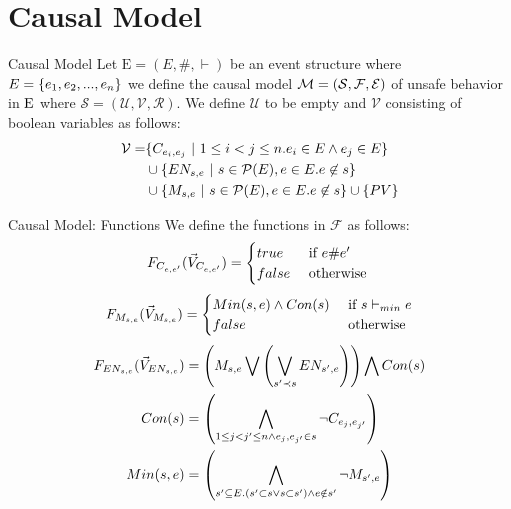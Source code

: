 \section{Causal Model}

\begin{frame}{Causal Model}
    Let $\mathrm{E} = (E,\#,\vdash)$ be an event structure where
    $E = \{e_1, e_2, ...,e_n\}$ we define the causal model
    $\mathcal{M} = (\mathcal{S},\mathcal{F},\mathcal{E})$ of unsafe behavior
    in $\mathrm{E}$ where
    $\mathcal{S} = (\mathcal{U},\mathcal{V},\mathcal{R})$.
    We define $\mathcal{U}$ to be empty and $\mathcal{V}$
    consisting of boolean variables as follows:
    \begin{align*}
        \mathcal{V} = & \{C_{e_i,e_j} ~|~  1 \leq i < j \leq n.
        e_i \in E \wedge e_j \in E\}                                \\
                      & \cup \{EN_{s,e} ~|~ s \in \mathcal{P}(E),
        e \in E. e \not \in s \}                                    \\
                      & \cup \{M_{s,e} ~|~ s \in \mathcal{P}(E),
            e \in E. e \not \in s \} \cup \{PV\}
    \end{align*}
\end{frame}

\begin{frame}{Causal Model: Functions}
    We define the functions in $\mathcal{F}$ as follows:
    $$
        F_{C_{e,e'}}(\vec V_{C_{e,e'}}) = \begin{cases}
            true  & \text{ if } e \# e' \\
            false & \text{ otherwise }
        \end{cases}
    $$
    $$
        F_{M_{s,e}}(\vec V_{M_{s,e}}) = \begin{cases}
            Min(s,e) \wedge Con(s) & \text{ if } s \vdash_{min} e \\
            false                  & \text{ otherwise }
        \end{cases}
    $$
    \begin{align*}
        F_{EN_{s,e}}(\vec V_{EN_{s,e}}) & =
        \left(
        M_{s,e} \bigvee
        \left(
        \bigvee_{s'\prec s}EN_{s',e}
        \right)
        \right)
        \bigwedge
        Con(s)                    \\
        Con(s)       & =   \left(
        \bigwedge_{ 1\leq j<j' \leq n \wedge e_j,e_{j'} \in s}
        \neg C_{e_j,e_{j'}}
        \right)                   \\
        Min(s,e)     & = \left(
        \bigwedge_{s' \subseteq E. (s' \subset s \vee s \subset s')
            \wedge e \notin s'}
        \neg M_{s',e}
        \right)
    \end{align*}
\end{frame}

